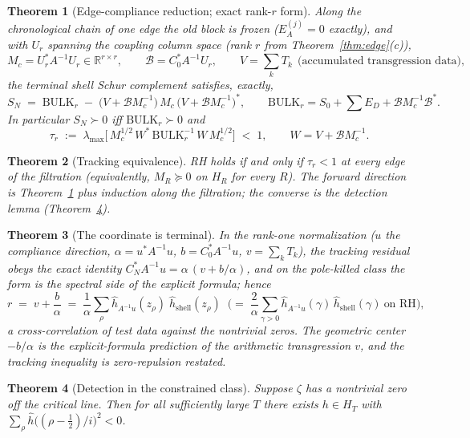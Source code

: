 \documentclass[11pt,reqno]{amsart}
\theoremstyle{plain}
\newtheorem{theorem}{Theorem}
\theoremstyle{definition}
\theoremstyle{remark}
\newcommand{\R}{\mathbb{R}}
\begin{document}
\begin{theorem}[Edge-compliance reduction; exact rank-$r$ form]\label{thm:compliance}
Along the chronological chain of one edge the old block is frozen
($E_A^{(j)} = 0$ exactly), and with $U_r$ spanning the coupling column space
(rank $r$ from Theorem~\ref{thm:edge}(c)),
\[
M_c = U_r^* A^{-1} U_r \in \R^{r\times r}, \qquad \mathcal{B} = C_0^* A^{-1} U_r, \qquad
V = \textstyle\sum_k T_k \ \ \text{(accumulated transgression data)},
\]
the terminal shell Schur complement satisfies, exactly,
\[
S_N \;=\; \mathrm{BULK}_r \;-\; \big(V + \mathcal{B} M_c^{-1}\big)\, M_c\, \big(V + \mathcal{B} M_c^{-1}\big)^{*},
\qquad \mathrm{BULK}_r = S_0 + \textstyle\sum E_D + \mathcal{B} M_c^{-1} \mathcal{B}^{*} .
\]
In particular $S_N \succ 0$ iff $\mathrm{BULK}_r \succ 0$ and
\[
\tau_r \;:=\; \lambda_{\max}\!\Big[\, M_c^{1/2}\, W^{*}\, \mathrm{BULK}_r^{-1}\, W\, M_c^{1/2} \Big]
\;<\; 1, \qquad W = V + \mathcal{B} M_c^{-1}.
\]
\end{theorem}

\begin{theorem}[Tracking equivalence]\label{thm:equiv}
RH holds if and only if $\tau_r < 1$ at every edge of the filtration (equivalently,
$M_R \succeq 0$ on $H_R$ for every $R$). The forward direction is
Theorem~\ref{thm:compliance} plus induction along the filtration; the converse is the
detection lemma (Theorem~\ref{thm:detect}).
\end{theorem}

\begin{theorem}[The coordinate is terminal]\label{thm:zerosum}
In the rank-one normalization ($u$ the compliance direction, $\alpha = u^* A^{-1}u$,
$b = C_0^* A^{-1}u$, $v = \sum_k T_k$), the tracking residual obeys the exact identity
$C_N^* A^{-1} u = \alpha\,(v + b/\alpha)$, and on the pole-killed class the form is the
spectral side of the explicit formula; hence
\[
r \;=\; v + \frac{b}{\alpha} \;=\; \frac{1}{\alpha} \sum_{\rho}
\hat h_{A^{-1}u}(z_\rho)\; \hat h_{\mathrm{shell}}(z_\rho)
\;\;\Big(=\; \frac{2}{\alpha} \sum_{\gamma > 0}
\hat h_{A^{-1}u}(\gamma)\, \hat h_{\mathrm{shell}}(\gamma) \ \text{on RH}\Big),
\]
a cross-correlation of test data against the nontrivial zeros. The geometric center
$-b/\alpha$ is the explicit-formula prediction of the arithmetic transgression $v$, and the
tracking inequality is zero-repulsion restated.
\end{theorem}

\begin{theorem}[Detection in the constrained class]\label{thm:detect}
Suppose $\zeta$ has a nontrivial zero off the critical line. Then for all sufficiently large
$T$ there exists $h \in H_T$ with $\sum_\rho \hat h\big((\rho-\tfrac12)/i\big)^2 < 0$.
\end{theorem}
\end{document}
